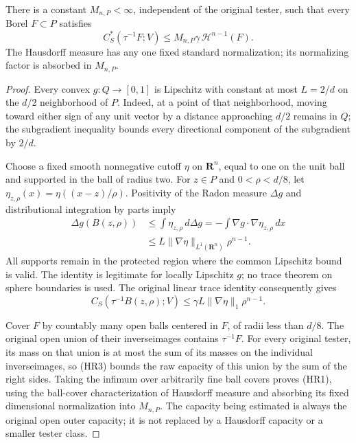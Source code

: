 \begin{lemma}
There is a constant $M_{n,P}<\infty$, independent of the original tester,
such that every Borel $F\subset P$ satisfies
\[
 C_S^*(\tau^{-1}F;V)
       \le M_{n,P}\gamma\,\mathcal H^{n-1}(F).
 \tag{HR1}
\]
The Hausdorff measure has any one fixed standard normalization; its
normalizing factor is absorbed in $M_{n,P}$.
\end{lemma}
\begin{proof}
Every convex $g:Q\to[0,1]$ is Lipschitz with constant at most
$L=2/d$ on the $d/2$ neighborhood of $P$. Indeed, at a point of that
neighborhood, moving toward either sign of any unit vector by a distance
approaching $d/2$ remains in $Q$; the subgradient inequality bounds every
directional component of the subgradient by $2/d$.

Choose a fixed smooth nonnegative cutoff $\eta$ on $\mathbf R^n$, equal
to one on the unit ball and supported in the ball of radius two. For
$z\in P$ and $0<\rho<d/8$, let
$\eta_{z,\rho}(x)=\eta((x-z)/\rho)$. Positivity of the Radon measure
$\Delta g$ and distributional integration by parts imply
\[
 \begin{split}
 \Delta g(B(z,\rho))
 &\le\int\eta_{z,\rho}\,d\Delta g
   =-\int\nabla g\cdot\nabla\eta_{z,\rho}\,dx\\
 &\le L\|\nabla\eta\|_{L^1(\mathbf R^n)}\rho^{n-1}.
 \end{split}
 \tag{HR2}
\]
All supports remain in the protected region where the common Lipschitz
bound is valid. The identity is legitimate for locally Lipschitz $g$;
no trace theorem on sphere boundaries is used. The original linear trace
identity consequently gives
\[
 C_S(\tau^{-1}B(z,\rho);V)
       \le\gamma L\|\nabla\eta\|_1\rho^{n-1}.
 \tag{HR3}
\]

Cover $F$ by countably many open balls centered in $F$, of radii less
than $d/8$. The original open union of their inverseimages contains
$\tau^{-1}F$. For every original tester, its mass on that union is at
most the sum of its masses on the individual inverseimages, so (HR3)
bounds the raw capacity of this union by the sum of the right sides.
Taking the infimum over arbitrarily fine ball covers proves (HR1),
using the ball-cover characterization of Hausdorff measure and absorbing
its fixed dimensional normalization into $M_{n,P}$. The capacity being
estimated is always the original open outer capacity; it is not replaced
by a Hausdorff capacity or a smaller tester class.
\end{proof}


